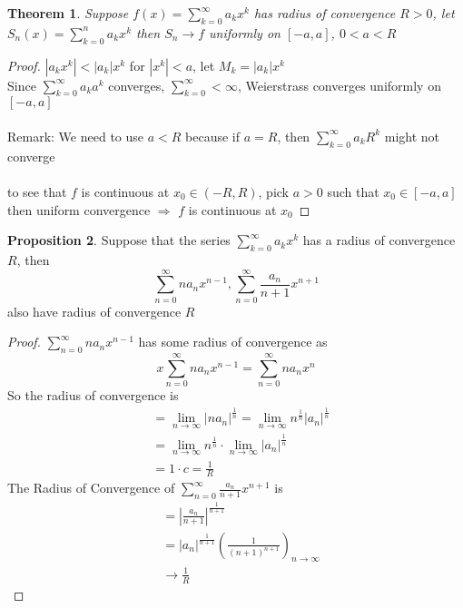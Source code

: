 \documentclass[12pt]{article}
\theoremstyle{plain}
\newtheorem{theorem}{Theorem}[section]
\theoremstyle{definition}
\newtheorem{proposition}[theorem]{Proposition}
\begin{document}
\begin{theorem}
	Suppose $f(x)=\sum^\infty_{k=0} a_k x^k$ has radius of convergence $R > 0$, let $S_n (x) = \sum^n_{k=0} a_k x^k$ then $S_n \to f$ uniformly on $[-a,a]$, $0 < a < R$
\end{theorem}

\begin{proof}
	$|a_k x^k| < |a_k| x^k$ for $|x^k| < a$, let $M_k = |a_k| x^k$\\
	Since $\sum^\infty_{k=0} a_k a^k$ converges, $\sum^\infty_{k=0} < \infty$, Weierstrass converges uniformly on $[-a,a]$\\
	\\
	Remark: We need to use $a<R$ because if $a=R$, then $\sum^\infty_{k=0} a_k R^k$ might not converge\\
	\\
	to see that $f$ is continuous at $x_0 \in (-R, R)$, pick $a > 0$ such that $x_0 \in [-a,a]$ then uniform convergence $\Longrightarrow$ $f$ is continuous at $x_0$
\end{proof}

\begin{proposition}
	Suppose that the series $\sum^\infty_{k=0} a_k x^k$ has a radius of convergence $R$, then
	$$\sum^\infty_{n=0} na_n x^{n-1}, \sum^\infty_{n=0} \frac{a_n}{n+1} x^{n+1}$$ also have radius of convergence $R$
\end{proposition}

\begin{proof}
	$\sum^\infty_{n=0} na_n x^{n-1}$ has some radius of convergence as $$x\sum^\infty_{n=0} na_n x^{n-1} = \sum^\infty_{n=0} na_n x^n$$
	So the radius of convergence is
	\begin{align*}
		&= \lim_{n\to\infty} |na_n|^{\frac{1}{n}} = \lim_{n\to\infty} n^\frac{1}{n} |a_n|^{\frac{1}{n}}\\
		&= \lim_{n\to\infty} n^\frac{1}{n} \cdot  \lim_{n\to\infty}  |a_n|^{\frac{1}{n}}\\
		&= 1 \cdot c = \frac{1}{R}
	\end{align*}
	The Radius of Convergence of $\sum^\infty_{n=0} \frac{a_n}{n+1} x^{n+1}$ is
	\begin{align*}
		&= |\frac{a_n}{n+1}|^{\frac{1}{n+1}}\\
		&= |a_n|^{\frac{1}{n+1}} (\frac{1}{(n+1)^{n+1}})_{n\to\infty}\\
		&\to \frac{1}{R} 
	\end{align*}
\end{proof}
\end{document}
